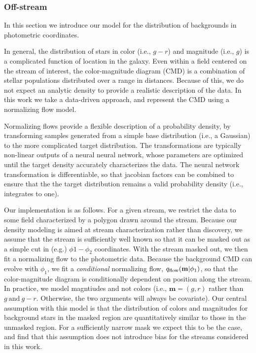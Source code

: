 \documentclass[twocolumn]{aastex631}
\begin{document}
    
        \subsubsection{Off-stream} \label{sub:photometric_model_off_stream}
            In this section we introduce our model for the distribution of backgrounds in photometric coordinates. 

            In general, the distribution of stars in color (i.e., $g-r$) and magnitude (i.e., $g$) is a complicated function of location in the galaxy. Even within a field centered on the stream of interest, the color-magnitude diagram (CMD) is a combination of stellar populations distributed over a range in distances. Because of this, we do not expect an analytic density to provide a realistic description of the data. In this work we take a data-driven approach, and represent the CMD using a normalizing flow model.

            Normalizing flows provide a flexible description of a probability density, by transforming samples generated from a simple base distribution (i.e., a Gaussian) to the more complicated target distribution. The transformations are typically non-linear outputs of a neural neural network, whose parameters are optimized until the target density accurately characterizes the data. The neural network transformation is differentiable, so that jacobian factors can be combined to ensure that the the target distribution remains a valid probability density (i.e., integrates to one).  

            Our implementation is as follows. For a given stream, we restrict the data to some field characterized by a polygon drawn around the stream. Because our density modeling is aimed at stream characterization rather than discovery, we assume that the stream is sufficiently well known so that it can be masked out as a simple cut in (e.g.) $\phi1-\phi_2$ coordinates. With the stream masked out, we then fit a normalizing flow to the photometric data. Because the background CMD can evolve with $\phi_1$, we fit a \emph{conditional} normalizing flow, $q_{\rm flow}(\mathbf{m}|\phi_1)$, so that the color-magnitude diagram is conditionally dependent on position along the stream. In practice, we model magntiudes and not colors (i.e., $\mathbf{m} = (g,r)$ rather than $g \ \mathrm{and} \ g-r$. Otherwise, the two arguments will always be covariate). Our central assumption with this model is that the distribution of colors and magnitudes for background stars in the masked region are quantitatively similar to those in the unmasked region. For a sufficiently narrow mask we expect this to be the case, and find that this assumption does not introduce bias for the streams considered in this work.
                
\end{document}
